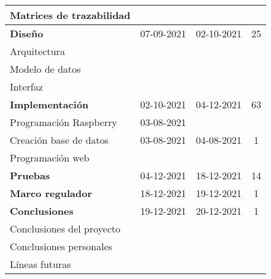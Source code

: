 \begin{longtable}[c]{lcc|c|}
	\multicolumn{1}{|l|}{Matrices de trazabilidad}      & \multicolumn{1}{c|}{}           &                                     &     \\ \hline
	\multicolumn{1}{|l|}{\textbf{Diseño}}               & \multicolumn{1}{c|}{07-09-2021} & 02-10-2021                          & 25  \\ \hline
	\multicolumn{1}{|l|}{Arquitectura}                  & \multicolumn{1}{c|}{}           &                                     &     \\ \hline
	\multicolumn{1}{|l|}{Modelo de datos}               & \multicolumn{1}{c|}{}           &                                     &     \\ \hline
	\multicolumn{1}{|l|}{Interfaz}                      & \multicolumn{1}{c|}{}           &                                     &     \\ \hline
	\multicolumn{1}{|l|}{\textbf{Implementación}}       & \multicolumn{1}{c|}{02-10-2021} & 04-12-2021                          & 63  \\ \hline
	\multicolumn{1}{|l|}{Programación Raspberry}        & \multicolumn{1}{c|}{03-08-2021} &                                     &     \\ \hline
	\multicolumn{1}{|l|}{Creación base de datos}        & \multicolumn{1}{c|}{03-08-2021} & 04-08-2021                          & 1   \\ \hline
	\multicolumn{1}{|l|}{Programación web}              & \multicolumn{1}{c|}{}           &                                     &     \\ \hline
	\multicolumn{1}{|l|}{\textbf{Pruebas}}              & \multicolumn{1}{c|}{04-12-2021} & 18-12-2021                          & 14  \\ \hline
	\multicolumn{1}{|l|}{\textbf{Marco regulador}}      & \multicolumn{1}{c|}{18-12-2021} & 19-12-2021                          & 1   \\ \hline
	\multicolumn{1}{|l|}{\textbf{Conclusiones}}         & \multicolumn{1}{c|}{19-12-2021} & 20-12-2021                          & 1   \\ \hline
	\multicolumn{1}{|l|}{Conclusiones del proyecto}     & \multicolumn{1}{c|}{}           &                                     &     \\ \hline
	\multicolumn{1}{|l|}{Conclusiones personales}       & \multicolumn{1}{c|}{}           &                                     &     \\ \hline
	\multicolumn{1}{|l|}{Líneas futuras}                & \multicolumn{1}{c|}{}           &                                     &     \\ \hline

\end{longtable}
